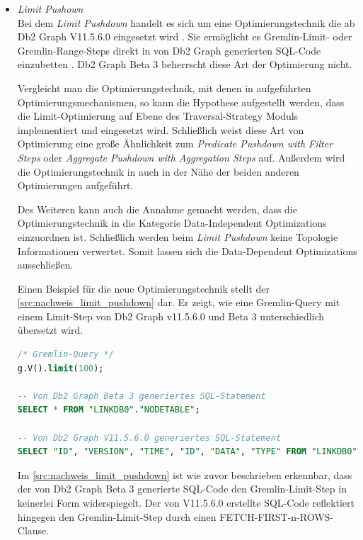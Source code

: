 \begin{itemize}
    \item \textit{Limit Pushown}\\
    Bei dem \textit{Limit Pushdown} handelt es sich um eine Optimierungstechnik die ab Db2 Graph V11.5.6.0 eingesetzt wird \cite{ibm_docs_optimize}. Sie ermöglicht es Gremlin-Limit- oder Gremlin-Range-Steps direkt in von Db2 Graph generierten SQL-Code einzubetten  \cite{ibm_docs_optimize}. Db2 Graph Beta 3 beherrscht diese Art der Optimierung nicht. 

    Vergleicht man die Optimierungstechnik, mit denen in  aufgeführten Optimierungsmechanismen, so kann die Hypothese aufgestellt werden, dass die Limit-Optimierung  auf Ebene des Traversal-Strategy Moduls implementiert und eingesetzt wird. Schließlich weist diese Art von Optimierung eine große Ähnlichkeit zum \textit{Predicate Pushdown with Filter Steps} oder \textit{Aggregate Pushdown with Aggregation Steps} auf. Außerdem wird die Optimierungstechnik in \cite{ibm_docs_optimize} auch in der Nähe der beiden anderen Optimierungen aufgeführt. 
    
    Des Weiteren kann auch die Annahme gemacht werden, dass die Optimierungstechnik in die Kategorie Data-Independent Optimizations einzuordnen ist. Schließlich werden beim \textit{Limit Pushdown} keine Topologie Informationen verwertet. Somit lassen sich die Data-Dependent Optimizations ausschließen.

    Einen Beispiel für die neue Optimierungstechnik stellt der \autoref{src:nachweis_limit_pushdown} dar. Er zeigt, wie eine Gremlin-Query mit einem Limit-Step von Db2 Graph v11.5.6.0 und Beta 3 unterschiedlich übersetzt wird.

\begin{lstlisting}[label=src:nachweis_limit_pushdown,caption={Nachweis Limit Pushdown Optimierung},language=SQL]
/* Gremlin-Query */
g.V().limit(100);

-- Von Db2 Graph Beta 3 generiertes SQL-Statement
SELECT * FROM "LINKDB0"."NODETABLE";

-- Von Db2 Graph V11.5.6.0 generiertes SQL-Statement
SELECT "ID", "VERSION", "TIME", "ID", "DATA", "TYPE" FROM "LINKDB0"."NODETABLE" FETCH FIRST 100 ROWS;
\end{lstlisting}

    Im \autoref{src:nachweis_limit_pushdown} ist wie zuvor beschrieben erkennbar, dass der von Db2 Graph Beta 3 generierte SQL-Code den Gremlin-Limit-Step in keinerlei  Form widerspiegelt. Der von V11.5.6.0 erstellte SQL-Code reflektiert hingegen den Gremlin-Limit-Step durch einen FETCH-FIRST-n-ROWS-Clause.


\end{itemize}
